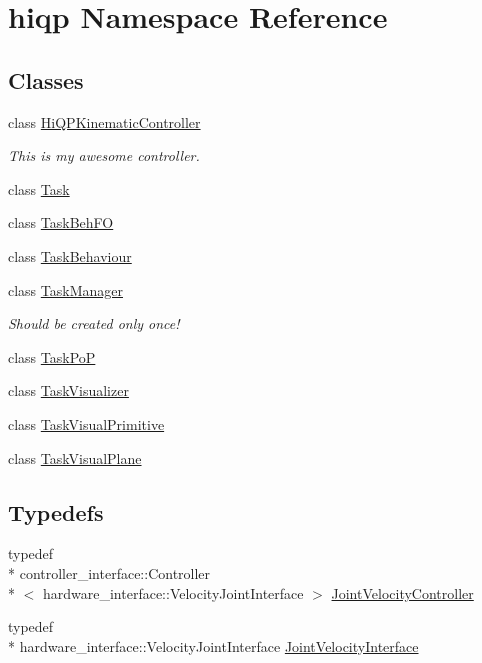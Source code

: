 \hypertarget{namespacehiqp}{\section{hiqp Namespace Reference}
\label{namespacehiqp}
}
\subsection*{Classes}
\begin{DoxyCompactItemize}
\item 
class \hyperlink{classhiqp_1_1HiQPKinematicController}{Hi\-Q\-P\-Kinematic\-Controller}
\begin{DoxyCompactList}\small\item\em This is my awesome controller. \end{DoxyCompactList}\item 
class \hyperlink{classhiqp_1_1Task}{Task}
\item 
class \hyperlink{classhiqp_1_1TaskBehFO}{Task\-Beh\-F\-O}
\item 
class \hyperlink{classhiqp_1_1TaskBehaviour}{Task\-Behaviour}
\item 
class \hyperlink{classhiqp_1_1TaskManager}{Task\-Manager}
\begin{DoxyCompactList}\small\item\em Should be created only once! \end{DoxyCompactList}\item 
class \hyperlink{classhiqp_1_1TaskPoP}{Task\-Po\-P}
\item 
class \hyperlink{classhiqp_1_1TaskVisualizer}{Task\-Visualizer}
\item 
class \hyperlink{classhiqp_1_1TaskVisualPrimitive}{Task\-Visual\-Primitive}
\item 
class \hyperlink{classhiqp_1_1TaskVisualPlane}{Task\-Visual\-Plane}
\end{DoxyCompactItemize}
\subsection*{Typedefs}
\begin{DoxyCompactItemize}
\item 
typedef \\*
controller\-\_\-interface\-::\-Controller\\*
$<$ hardware\-\_\-interface\-::\-Velocity\-Joint\-Interface $>$ \hyperlink{namespacehiqp_a7b250295f6797153486ce8ab085bd450}{Joint\-Velocity\-Controller}
\item 
typedef \\*
hardware\-\_\-interface\-::\-Velocity\-Joint\-Interface \hyperlink{namespacehiqp_ac536ca3b4ba33489281fa5bec490799c}{Joint\-Velocity\-Interface}
\end{DoxyCompactItemize}
